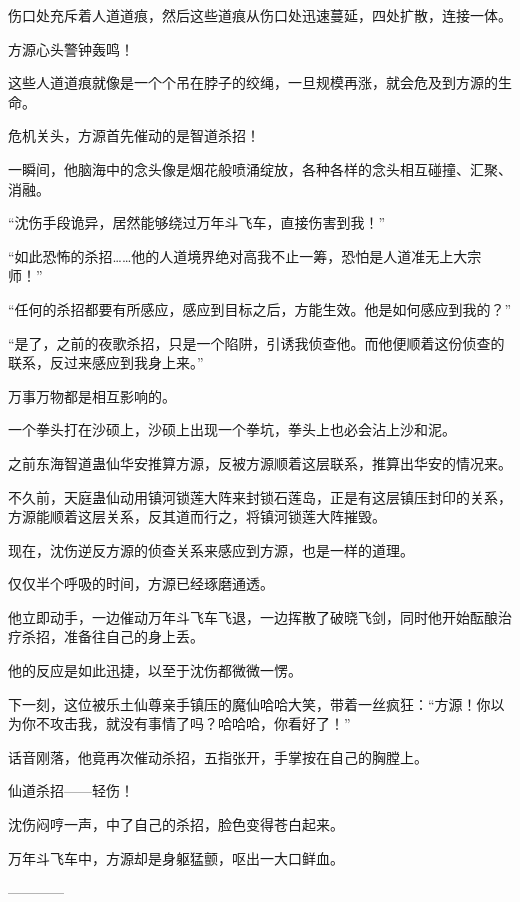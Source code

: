 \begin{this_body}
伤口处充斥着人道道痕，然后这些道痕从伤口处迅速蔓延，四处扩散，连接一体。

方源心头警钟轰鸣！

这些人道道痕就像是一个个吊在脖子的绞绳，一旦规模再涨，就会危及到方源的生命。

危机关头，方源首先催动的是智道杀招！

一瞬间，他脑海中的念头像是烟花般喷涌绽放，各种各样的念头相互碰撞、汇聚、消融。

“沈伤手段诡异，居然能够绕过万年斗飞车，直接伤害到我！”

“如此恐怖的杀招……他的人道境界绝对高我不止一筹，恐怕是人道准无上大宗师！”

“任何的杀招都要有所感应，感应到目标之后，方能生效。他是如何感应到我的？”

“是了，之前的夜歌杀招，只是一个陷阱，引诱我侦查他。而他便顺着这份侦查的联系，反过来感应到我身上来。”

万事万物都是相互影响的。

一个拳头打在沙硕上，沙硕上出现一个拳坑，拳头上也必会沾上沙和泥。

之前东海智道蛊仙华安推算方源，反被方源顺着这层联系，推算出华安的情况来。

不久前，天庭蛊仙动用镇河锁莲大阵来封锁石莲岛，正是有这层镇压封印的关系，方源能顺着这层关系，反其道而行之，将镇河锁莲大阵摧毁。

现在，沈伤逆反方源的侦查关系来感应到方源，也是一样的道理。

仅仅半个呼吸的时间，方源已经琢磨通透。

他立即动手，一边催动万年斗飞车飞退，一边挥散了破晓飞剑，同时他开始酝酿治疗杀招，准备往自己的身上丢。

他的反应是如此迅捷，以至于沈伤都微微一愣。

下一刻，这位被乐土仙尊亲手镇压的魔仙哈哈大笑，带着一丝疯狂：“方源！你以为你不攻击我，就没有事情了吗？哈哈哈，你看好了！”

话音刚落，他竟再次催动杀招，五指张开，手掌按在自己的胸膛上。

仙道杀招——轻伤！

沈伤闷哼一声，中了自己的杀招，脸色变得苍白起来。

万年斗飞车中，方源却是身躯猛颤，呕出一大口鲜血。

------------

\end{this_body}

